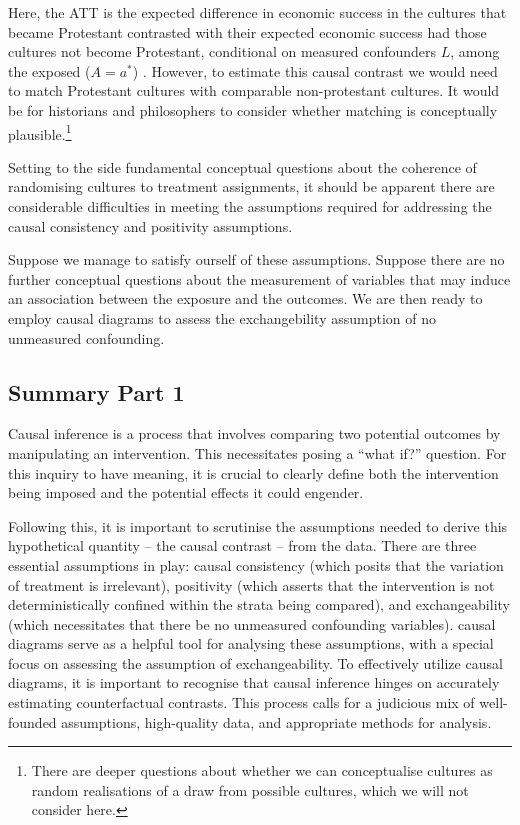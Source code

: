 \documentclass[
  singlecolumn]{report}
\begin{document}
Here, the ATT is the expected difference in economic success in the
cultures that became Protestant contrasted with their expected economic
success had those cultures not become Protestant, conditional on
measured confounders \(L\), among the exposed (\(A = a^*\)) . However,
to estimate this causal contrast we would need to match Protestant
cultures with comparable non-protestant cultures. It would be for
historians and philosophers to consider whether matching is conceptually
plausible.\footnote{There are deeper questions about whether we can
  conceptualise cultures as random realisations of a draw from possible
  cultures, which we will not consider here.}

Setting to the side fundamental conceptual questions about the coherence
of randomising cultures to treatment assignments, it should be apparent
there are considerable difficulties in meeting the assumptions required
for addressing the causal consistency and positivity assumptions.

Suppose we manage to satisfy ourself of these assumptions. Suppose there
are no further conceptual questions about the measurement of variables
that may induce an association between the exposure and the outcomes. We
are then ready to employ causal diagrams to assess the exchangebility
assumption of no unmeasured confounding.

\hypertarget{summary-part-1}{%
\subsection{Summary Part 1}\label{summary-part-1}}

Causal inference is a process that involves comparing two potential
outcomes by manipulating an intervention. This necessitates posing a
``what if?'' question. For this inquiry to have meaning, it is crucial
to clearly define both the intervention being imposed and the potential
effects it could engender.

Following this, it is important to scrutinise the assumptions needed to
derive this hypothetical quantity -- the causal contrast -- from the
data. There are three essential assumptions in play: causal consistency
(which posits that the variation of treatment is irrelevant), positivity
(which asserts that the intervention is not deterministically confined
within the strata being compared), and exchangeability (which
necessitates that there be no unmeasured confounding variables). causal
diagrams serve as a helpful tool for analysing these assumptions, with a
special focus on assessing the assumption of exchangeability. To
effectively utilize causal diagrams, it is important to recognise that
causal inference hinges on accurately estimating counterfactual
contrasts. This process calls for a judicious mix of well-founded
assumptions, high-quality data, and appropriate methods for analysis.
\end{document}
